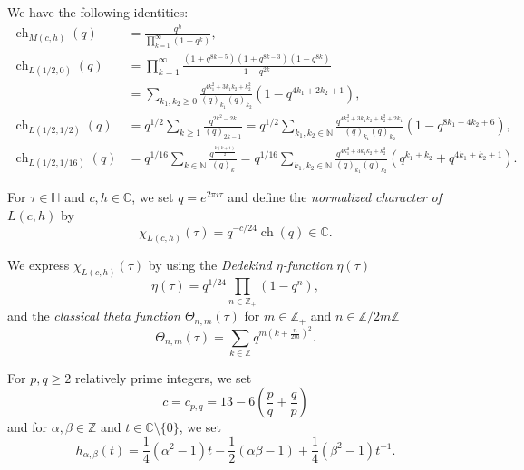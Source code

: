 \documentclass{beamer}
\DeclareMathOperator{\ch}{ch}
\begin{document}
\begin{frame}
  \begin{theorem}
    We have the following identities:
    \footnotesize
    \begin{align*}
      \ch_{M(c, h)}(q) &= \frac{q^h}{\prod_{k = 1}^{\infty}(1 - q^k)}, \\
      \ch_{L(1/2, 0)}(q) &= \prod_{k = 1}^{\infty}\frac{(1 + q^{8k - 5})(1 + q^{8k - 3})(1 - q^{8k})}{1 - q^{2k}} \\
                       &= \sum_{k_1, k_2 \ge 0}\frac{q^{4k_1^2 + 3k_1k_2 + k_2^2}}{(q)_{k_1}(q)_{k_2}}(1 - q^{4k_1 + 2k_2 + 1}), \\
      \ch_{L(1/2, 1/2)}(q) &= q^{1/2}\sum_{k \ge 1}\frac{q^{2k^2 - 2k}}{(q)_{2k - 1}} = q^{1/2}\sum_{k_1, k_2 \in \mathbb{N}}\frac{q^{4k_1^2 + 3k_1k_2 + k_2^2 + 2k_1}}{(q)_{k_1}(q)_{k_2}}(1 - q^{8k_1 + 4k_2 + 6}), \\
      \ch_{L(1/2, 1/16)}(q) &= q^{1/16}\sum_{k \in \mathbb{N}}\frac{q^{\frac{k(k + 1)}{2}}}{(q)_k} = q^{1/16}\sum_{k_1, k_2 \in \mathbb{N}}\frac{q^{4k_1^2 + 3k_1k_2 + k_2^2}}{(q)_{k_1}(q)_{k_2}}(q^{k_1 + k_2} + q^{4k_1 + k_2 + 1}).
    \end{align*}
  \end{theorem}
\end{frame}

\begin{frame}
  For $\tau \in \mathbb{H}$ and $c, h \in \mathbb{C}$, we set $q = e^{2\pi i\tau}$ and define the \emph{normalized character of $L(c, h)$} by
  \begin{equation*}
    \chi_{L(c, h)}(\tau) = q^{-c/24}\ch(q) \in \mathbb{C}.
  \end{equation*}

  We express $\chi_{L(c, h)}(\tau)$ by using the \emph{Dedekind $\eta$-function} $\eta(\tau)$
  \begin{equation*}
    \eta(\tau) = q^{1/24}\prod_{n \in \mathbb{Z}_+}(1 - q^n),
  \end{equation*}
  and the \emph{classical theta function $\Theta_{n, m}(\tau)$} for $m \in \mathbb{Z}_+$ and $n \in \mathbb{Z}/2m\mathbb{Z}$
  \begin{equation*}
    \Theta_{n, m}(\tau) = \sum_{k \in \mathbb{Z}}q^{m(k + \frac{n}{2m})^2}.
  \end{equation*}

  For $p, q \ge 2$ relatively prime integers, we set
  \begin{equation*}
    c = c_{p, q} = 13 - 6\left(\frac{p}{q} + \frac{q}{p}\right)
  \end{equation*}
  and for $\alpha, \beta \in \mathbb{Z}$ and $t \in \mathbb{C} \setminus \{0\}$, we set
  \begin{equation*}
    h_{\alpha, \beta}(t) = \frac{1}{4}(\alpha^2 - 1)t - \frac{1}{2}(\alpha\beta - 1) + \frac{1}{4}(\beta^2-1)t^{-1}.
  \end{equation*}
\end{frame}
\end{document}
